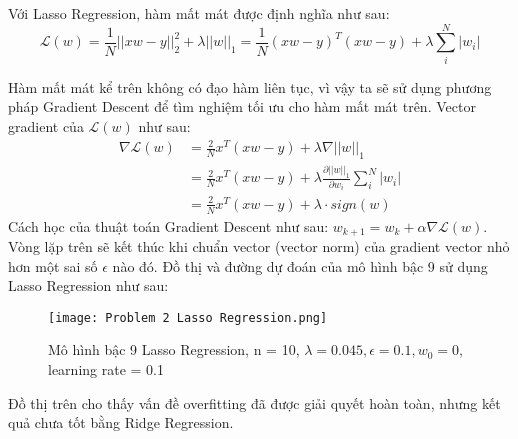\documentclass[a4paper, 12pt]{article}  %
\begin{document}
\begin{enumerate}[label=\alph*.]
    Với Lasso Regression, hàm mất mát được định nghĩa như sau:
    \[\mathcal{L}(w) = \frac{1}{N} ||xw - y||^2_2 + \lambda||w||_1 
    = \frac{1}{N} (xw - y)^T (xw - y) + \lambda \sum^N_i |w_i|\]
    
    Hàm mất mát kể trên không có đạo hàm liên tục, vì vậy ta sẽ sử dụng phương pháp Gradient Descent để tìm nghiệm tối ưu cho hàm mất mát trên. Vector gradient của $\mathcal{L}(w)$ như sau:
    \begin{align*}
        \nabla \mathcal{L}(w) &= \frac{2}{N} x^T (xw - y) + \lambda \nabla ||w||_1 \\
        &= \frac{2}{N} x^T (xw - y) + \lambda \frac{\partial ||w||_1}{\partial w_i} \sum^N_i |w_i| \\
        &= \frac{2}{N} x^T (xw - y) + \lambda \cdot sign(w)
    \end{align*}
    Cách học của thuật toán Gradient Descent như sau: \(w_{k+1} = w_k + \alpha \nabla \mathcal{L}(w)\). Vòng lặp trên sẽ kết thúc khi chuẩn vector (vector norm) của gradient vector nhỏ hơn một sai số $\epsilon$ nào đó.
    Đồ thị và đường dự đoán của mô hình bậc 9 sử dụng Lasso Regression như sau:
    \begin{figure}[H]
        \centering
        \texttt{[image: Problem 2 Lasso Regression.png]}
        \caption{Mô hình bậc 9 Lasso Regression, n = 10, $\lambda = 0.045, \epsilon = 0.1, w_0 = 0$, learning rate = 0.1}
        \label{fig:Data8}
    \end{figure}
    Đồ thị trên cho thấy vấn đề overfitting đã được giải quyết hoàn toàn, nhưng kết quả chưa tốt bằng Ridge Regression.
\end{enumerate}
\end{document}
